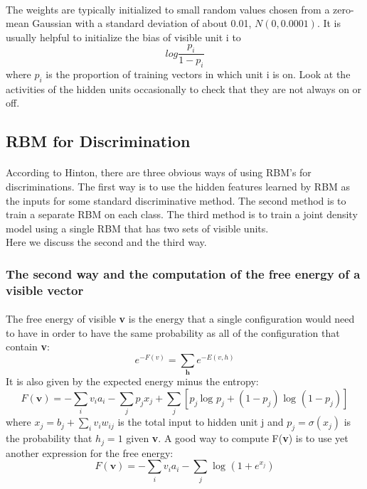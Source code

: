 \documentclass{article}
\begin{document}
\paragraph{}The weights are typically initialized to small random values chosen from a zero-mean Gaussian with a standard deviation of about 0.01, $N(0,0.0001)$. It is usually helpful to initialize the bias of visible unit i to
\[log\frac{p_i}{1-p_i}\]
where $p_i$ is the proportion of training vectors in which unit i is on. Look at the activities of the hidden units occasionally to check that they are not always on or off.
\subsection{RBM for Discrimination}
\paragraph{}
According to Hinton, there are three obvious ways of using RBM's for discriminations. The first way is to use the hidden features learned by RBM as the inputs for some standard discriminative method. The second method is to train a separate RBM on each class. The third method is to train a joint density model using a single RBM that has two sets of visible units.\\
Here we discuss the second and the third way.\\
\subsubsection{The second way and the computation of the free energy of a visible vector}
\paragraph{}
The free energy of visible \textbf{v} is the energy that a single configuration would need to have in order to have the same probability as all of the configuration that contain \textbf{v}:
\[e^{-F(v)}=\sum_{\textbf{h}}e^{-E(v,h)}\]
It is also given by the expected energy minus the entropy:
\[F(\textbf{v})=-\sum_iv_ia_i-\sum_jp_jx_j+\sum_j[p_j\ \text{log }p_j+(1-p_j)\text{ log }(1-p_j)]\]
where $x_j=b_j+\sum\limits_iv_iw_{ij}$ is the total input to hidden unit j and $p_j=\sigma(x_j)$ is the probability that $h_j=1$ given \textbf{v}. A good way to compute F(\textbf{v}) is to use yet another expression for the free energy:
\[F(\textbf{v})=-\sum_iv_ia_i-\sum_j\text{ log }(1+e^{x_j})\]
\end{document}
